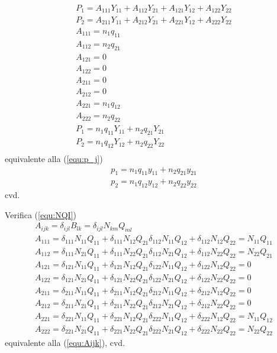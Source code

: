 \documentclass[a4paper,11pt]{article}
\begin{document}
\[
\begin{array}{ll}
P_1 = A_{111}Y_{11} + A_{112}Y_{21} +
A_{121}Y_{12} + A_{122}Y_{22} \\
P_2 = A_{211}Y_{11} + A_{212}Y_{21} +
A_{221}Y_{12} + A_{222}Y_{22} \\

A_{111} = n_1 q_{11} \\
A_{112} = n_2 q_{21} \\
A_{121} = 0 \\
A_{122} = 0 \\
A_{211} = 0 \\
A_{212} = 0 \\
A_{221} = n_1 q_{12} \\
A_{222} = n_2 q_{22} \\

P_1 = n_1 q_{11}Y_{11} + n_2 q_{21}Y_{21} \\
P_2 = n_1 q_{12}Y_{12} + n_2 q_{22}Y_{22} \\
\end{array}
\]
equivalente alla (\ref{equ:p_j})
\[
\begin{array}{ll}
p_1 = n_1 q_{11} y_{11} + n_2 q_{21} y_{21} \\
p_2 = n_1 q_{12} y_{12} + n_2 q_{22} y_{22}
\end{array}
\]
cvd.


Verifica (\ref{equ:NQI})
\[
\begin{array}{ll}
A_{ijk} = \delta_{ijl} B_{lk}
= \delta_{ijl} N_{km} Q_{ml} \\

A_{111} = \delta_{111} N_{11} Q_{11} + 
\delta_{111} N_{12} Q_{21}
\delta_{112} N_{11} Q_{12} + 
\delta_{112} N_{12} Q_{22} =
N_{11} Q_{11} \\
A_{112} = \delta_{111} N_{21} Q_{11} + 
\delta_{111} N_{22} Q_{21}
\delta_{112} N_{21} Q_{12} + 
\delta_{112} N_{22} Q_{22} =
N_{22} Q_{21} \\
A_{121} = \delta_{121} N_{11} Q_{11} + 
\delta_{121} N_{12} Q_{21}
\delta_{122} N_{11} Q_{12} + 
\delta_{122} N_{12} Q_{22} = 0 \\
A_{122} = \delta_{121} N_{21} Q_{11} + 
\delta_{121} N_{22} Q_{21}
\delta_{122} N_{21} Q_{12} + 
\delta_{122} N_{22} Q_{22} = 0 \\
A_{211} = \delta_{211} N_{11} Q_{11} + 
\delta_{211} N_{12} Q_{21}
\delta_{212} N_{11} Q_{12} + 
\delta_{212} N_{12} Q_{22} = 0 \\
A_{212} = \delta_{211} N_{21} Q_{11} + 
\delta_{211} N_{22} Q_{21}
\delta_{212} N_{21} Q_{12} + 
\delta_{212} N_{22} Q_{22} = 0 \\
A_{221} = \delta_{221} N_{11} Q_{11} + 
\delta_{221} N_{12} Q_{21}
\delta_{222} N_{11} Q_{12} + 
\delta_{222} N_{12} Q_{22} =
N_{11} Q_{12} \\
A_{222} = \delta_{221} N_{21} Q_{11} + 
\delta_{221} N_{22} Q_{21}
\delta_{222} N_{21} Q_{12} + 
\delta_{222} N_{22} Q_{22} =
N_{22} Q_{22}
\end{array}
\]
equivalente alla (\ref{equ:Aijk}), cvd.
\end{document}
